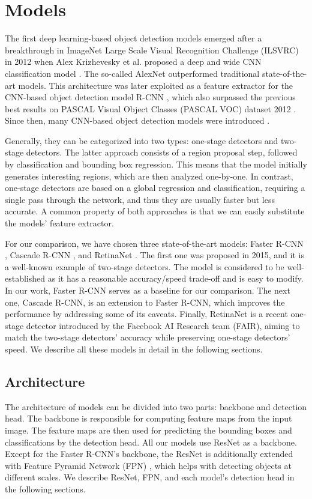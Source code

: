 \chapter{Models}
The first deep learning-based object detection models emerged after a breakthrough in ImageNet Large Scale Visual Recognition Challenge (ILSVRC) \cite{ILSVRC15} in 2012 when Alex Krizhevesky et al. proposed a deep and wide CNN classification model . The so-called AlexNet outperformed traditional state-of-the-art models.  This architecture was later exploited as a feature extractor for the CNN-based object detection model R-CNN \cite{rcnn}, which also surpassed the previous best results on PASCAL Visual Object Classes (PASCAL VOC) dataset 2012 \cite{voc}. Since then, many CNN-based object detection models were introduced \cite{odreview}.

Generally, they can be categorized into two types: one-stage detectors and two-stage detectors. The latter approach consists of a region proposal step, followed by classification and bounding box regression. This means that the model initially generates interesting regions, which are then analyzed one-by-one. In contrast, one-stage detectors are based on a global regression and classification, requiring a single pass through the network, and thus they are usually faster but less accurate. A common property of both approaches is that we can easily substitute the models' feature extractor. 

For our comparison, we have chosen three state-of-the-art models: Faster R-CNN \cite{fasterrcnn}, Cascade R-CNN \cite{cascadercnn}, and RetinaNet \cite{retinanet}. The first one was proposed in 2015, and it is a well-known example of two-stage detectors. The model is considered to be well-established as it has a reasonable accuracy/speed trade-off and is easy to modify. In our work, Faster R-CNN serves as a baseline for our comparison. The next one, Cascade R-CNN, is an extension to Faster R-CNN, which improves the performance by addressing some of its caveats. Finally, RetinaNet is a recent one-stage detector introduced by the Facebook AI Research team (FAIR), aiming to match the two-stage detectors' accuracy while preserving one-stage detectors' speed. We describe all these models in detail in the following sections.

\section{Architecture}
The architecture of models can be divided into two parts: backbone and detection head. The backbone is responsible for computing feature maps from the input image. The feature maps are then used for predicting the bounding boxes and classifications by the detection head. All our models use ResNet \cite{resnet} as a backbone. Except for the Faster R-CNN's backbone, the ResNet is additionally extended with Feature Pyramid Network (FPN) \cite{fpn}, which helps with detecting objects at different scales. We describe ResNet, FPN, and each model's detection head in the following sections.


